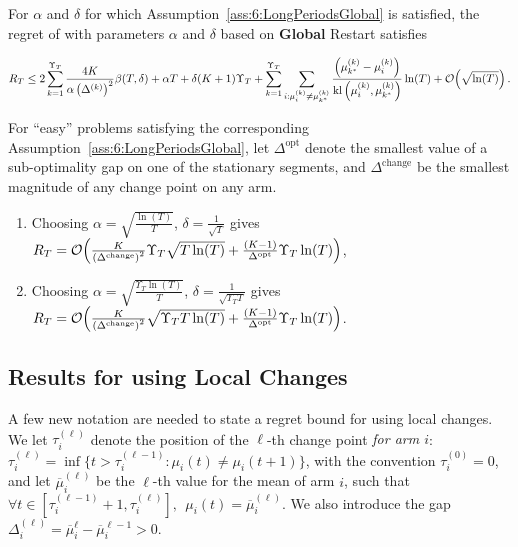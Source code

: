 \begin{theorem}
    \label{thm:6:mainRegretBoundGlobal}
    For $\alpha$ and $\delta$ for which Assumption~\ref{ass:6:LongPeriodsGlobal} is satisfied, the regret of \GLRklUCB{} with parameters $\alpha$ and $\delta$ based on \textbf{Global} Restart satisfies
    \begin{small}
\[R_T \leq 2\sum_{k=1}^{\Upsilon_T} \frac{4K}{\alpha \left(\Delta^{(k)}\right)^2}\beta(T,\delta) +\alpha T + \delta (K+1)\Upsilon_T  + \sum_{k=1}^{\Upsilon_T}\sum_{i : \mu_i^{(k)} \neq \mu_{k^*}^{(k)}} \frac{\left( \mu_{k^*}^{(k)}-\mu_i^{(k)}\right)}{\mathrm{kl}\left(\mu_i^{(k)},\mu_{k^*}^{(k)}\right)}\ln(T) + \mathop{}\mathopen{}\mathcal{O}\mathopen{}\left(\sqrt{\ln(T)}\right).\]
    \end{small}
\end{theorem}

\begin{corollary}\label{cor:6:Global}
    For ``easy'' problems satisfying the corresponding Assumption~\ref{ass:6:LongPeriodsGlobal},
    let $\Delta^{\text{opt}}$ denote the smallest value of a sub-optimality gap on one of the stationary segments, and $\Delta^{\text{change}}$ be the smallest magnitude of any change point on any arm.
    \begin{enumerate}
        \item Choosing $\alpha = \sqrt{\frac{\ln(T)}{T}}$, $\delta = \frac{1}{\sqrt{T}}$ gives $R_T = \mathop{}\mathopen{}\mathcal{O}\mathopen{}\left(\frac{K}{\left(\Delta^{\text{change}}\right)^2} \Upsilon_T\sqrt{T\ln(T)} + \frac{(K-1)}{\Delta^{\text{opt}}} \Upsilon_T\ln(T)\right)$,
        \item Choosing $\alpha = \sqrt{\frac{\Upsilon_T\ln(T)}{T}}$, $\delta = \frac{1}{\sqrt{\Upsilon_T T}}$ gives $R_T = \mathop{}\mathopen{}\mathcal{O}\mathopen{}\left(\frac{K}{\left(\Delta^{\text{change}}\right)^2}\sqrt{\Upsilon_T T \ln(T)} + \frac{(K-1)}{\Delta^{\text{opt}}} \Upsilon_T\ln(T)\right)$.
    \end{enumerate}
\end{corollary}


\subsection{Results for \GLRklUCB{} using Local Changes}

A few new notation are needed to state a regret bound for \GLRklUCB{} using local changes. We let $\tau_i^{(\ell)}$ denote the position of the $\ell$-th change point \emph{for arm $i$}: $\tau_i^{(\ell)} = \inf \{ t > \tau_i^{(\ell - 1)} : \mu_i(t) \neq \mu_i(t+1)\}$,
with the convention $\tau_i^{(0)}=0$, and let $\overline{\mu}_i^{(\ell)}$ be the $\ell$-th value for the mean of arm $i$, such that $\forall t \in [\tau_i^{(\ell-1)}+1, \tau_i^{(\ell)}], \ \ \mu_i(t) = \overline{\mu}_i^{(\ell)}$. We also introduce the gap $\Delta_i^{(\ell)} = \overline{\mu}_i^{\ell} - \overline{\mu}_i^{\ell-1} > 0$.

